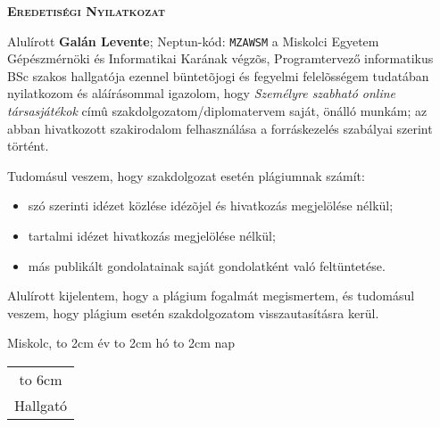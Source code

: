 \vspace*{1cm}  
\begin{center}
\large\textsc{\bfseries Eredetiségi Nyilatkozat}
\end{center}
\vspace*{2cm}

Alulírott \textbf{Galán Levente}; Neptun-kód: \texttt{MZAWSM} a Miskolci Egyetem Gépészmérnöki és Informatikai Karának végzõs, Programtervező informatikus BSc szakos hallgatója ezennel büntetõjogi és fegyelmi felelõsségem tudatában nyilatkozom és aláírásommal igazolom, hogy
\textit{
Személyre szabható online társasjátékok
}
címû szakdolgozatom/diplomatervem saját, önálló munkám; az abban hivatkozott szakirodalom
felhasználása a forráskezelés szabályai szerint történt.

Tudomásul veszem, hogy szakdolgozat esetén plágiumnak számít:
\begin{itemize}
\item szó szerinti idézet közlése idézõjel és hivatkozás megjelölése nélkül;
\item tartalmi idézet hivatkozás megjelölése nélkül;
\item más publikált gondolatainak saját gondolatként való feltüntetése.
\end{itemize}

Alulírott kijelentem, hogy a plágium fogalmát megismertem, és tudomásul veszem, hogy
plágium esetén szakdolgozatom visszautasításra kerül.

\vspace*{3cm}

\noindent Miskolc, \hbox to 2cm{\dotfill} év \hbox to 2cm{\dotfill} hó \hbox to 2cm{\dotfill} nap

\vspace*{3cm}

\hspace*{8cm}\begin{tabular}{c}
\hbox to 6cm{\dotfill}\\
Hallgató
\end{tabular}
